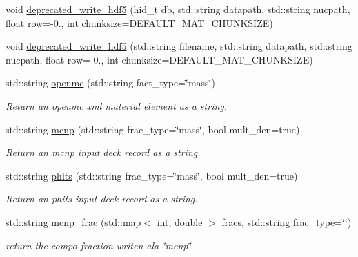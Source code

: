 \begin{DoxyCompactItemize}
\item 
void \hyperlink{classpyne_1_1_material_a646866fc4aebfd7aa955230f0271ce43}{deprecated\+\_\+write\+\_\+hdf5} (hid\+\_\+t db, std\+::string datapath, std\+::string nucpath, float row=-\/0., int chunksize=D\+E\+F\+A\+U\+L\+T\+\_\+\+M\+A\+T\+\_\+\+C\+H\+U\+N\+K\+S\+I\+ZE)
\item 
void \hyperlink{classpyne_1_1_material_a09bc3aae3b4b214b8d503f0cc2f5862b}{deprecated\+\_\+write\+\_\+hdf5} (std\+::string filename, std\+::string datapath, std\+::string nucpath, float row=-\/0., int chunksize=D\+E\+F\+A\+U\+L\+T\+\_\+\+M\+A\+T\+\_\+\+C\+H\+U\+N\+K\+S\+I\+ZE)
\item 
\mbox{\label{classpyne_1_1_material_a0d712a1714e15c339b19c020658ff83d}} 
std\+::string \hyperlink{classpyne_1_1_material_a0d712a1714e15c339b19c020658ff83d}{openmc} (std\+::string fact\+\_\+type=\char`\"{}mass\char`\"{})
\begin{DoxyCompactList}\small\item\em Return an openmc xml material element as a string. \end{DoxyCompactList}\item 
std\+::string \hyperlink{classpyne_1_1_material_a3578549b31e08e6fdf32fd07b1b2ca49}{mcnp} (std\+::string frac\+\_\+type=\char`\"{}mass\char`\"{}, bool mult\+\_\+den=true)
\begin{DoxyCompactList}\small\item\em Return an mcnp input deck record as a string. \end{DoxyCompactList}\item 
std\+::string \hyperlink{classpyne_1_1_material_a3027c85c9910b73e6f4a8012db382532}{phits} (std\+::string frac\+\_\+type=\char`\"{}mass\char`\"{}, bool mult\+\_\+den=true)
\begin{DoxyCompactList}\small\item\em Return an phits input deck record as a string. \end{DoxyCompactList}\item 
\mbox{\label{classpyne_1_1_material_a7e1009f6d3525aafaa9ba33d10e05776}} 
std\+::string \hyperlink{classpyne_1_1_material_a7e1009f6d3525aafaa9ba33d10e05776}{mcnp\+\_\+frac} (std\+::map$<$ int, double $>$ fracs, std\+::string frac\+\_\+type=\char`\"{}\char`\"{})
\begin{DoxyCompactList}\small\item\em return the compo fraction writen ala \char`\"{}mcnp\char`\"{} \end{DoxyCompactList}\item 

\end{DoxyCompactItemize}

